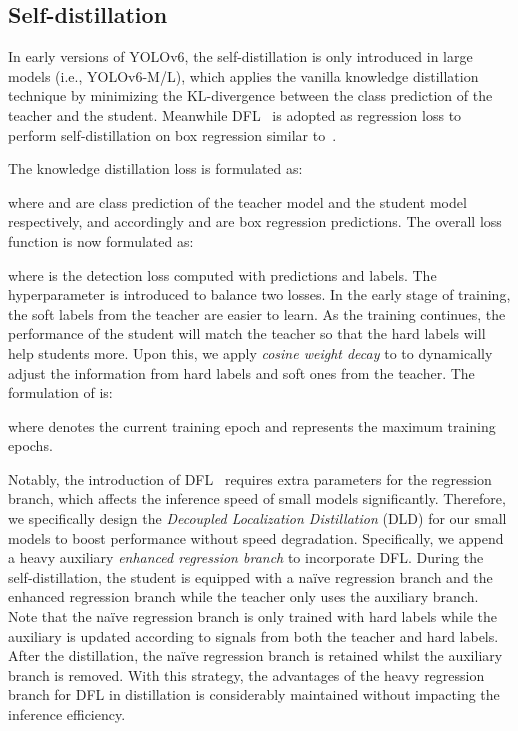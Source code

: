 \documentclass[10pt,twocolumn,letterpaper]{article}
\begin{document}
  \subsection{Self-distillation}
    In early versions of YOLOv6, the self-distillation is only introduced in large models (i.e., YOLOv6-M/L), which applies the vanilla knowledge distillation technique by minimizing the KL-divergence between the class prediction of the teacher and the student. Meanwhile DFL~\cite{li2020generalized} is adopted as regression loss to perform self-distillation on box regression similar to~\cite{zheng2022localization}.

  The knowledge distillation loss is formulated as: 
 
 where  and  are class prediction of the teacher model and the student model respectively, and accordingly  and  are box regression predictions. The overall loss function is now formulated as:
 
 where  is the detection loss computed with predictions and labels. The hyperparameter  is introduced to balance two losses. In the early stage of training, the soft labels from the teacher are easier to learn. As the training continues, the performance of the student will match the teacher so that the hard labels will help students more. Upon this, we apply \emph{cosine weight decay} to  to dynamically adjust the information from hard labels and soft ones from the teacher. 
  The formulation of  is:
 
where  denotes the current training epoch and  represents the maximum training epochs.
 
Notably, the introduction of DFL~\cite{li2020generalized} requires extra parameters for the regression branch, which affects the inference speed of small models significantly. Therefore, we specifically design the \emph{Decoupled Localization Distillation} (DLD) for our small models to boost performance without speed degradation. Specifically, we append a heavy auxiliary \emph{enhanced regression branch} to incorporate DFL. During the self-distillation, the student is equipped with a na\"ive regression branch and the enhanced regression branch while the teacher only uses the auxiliary branch. Note that the na\"ive regression branch is only trained with hard labels while the auxiliary is updated according to signals from both the teacher and hard labels. After the distillation, the na\"ive regression branch is retained whilst the auxiliary branch is removed. With this strategy, the advantages of the heavy regression branch for DFL in distillation is considerably maintained without impacting the inference efficiency.
  
\end{document}
